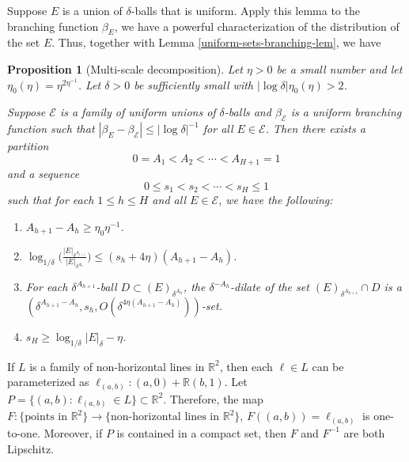 \documentclass{amsart}
\numberwithin{equation}{section}
\newtheorem{proposition}[theorem]{Proposition}
\newcommand{\be}{\beta}
\newcommand{\de}{\delta}
\newcommand{\vp}{\varphi}
\newcommand{\ce}{\mathcal E}
\newcommand{\ZR}{\mathbb{R}}
\begin{document}
Suppose $E$ is a union of $\de$-balls that is uniform.
Apply this lemma to the branching function $\be_E$, we have a powerful characterization of the distribution of the set $E$.
Thus, together with Lemma \ref{uniform-sets-branching-lem}, we have

\begin{proposition}[Multi-scale decomposition]
\label{multiscale-prop}
Let $\eta>0$ be a small number and let $\eta_0(\eta)=\eta^{2\eta^{-1}}$. 
Let $\delta>0$ be sufficiently small with  $|\log \delta| \eta_0(\eta) >2$. 


Suppose $\ce$ is a family of uniform unions of $\de$-balls and $\be_\ce$ is a uniform branching function such that $|\be_{E}-\be_{\ce}|\leq |\log \delta|^{-1}$ for all $E\in \ce$. 
Then there exists a partition
\begin{equation}
    0=A_1<A_2<\cdots<A_{H+1}=1
\end{equation}
and a sequence 
\begin{equation}
    0\leq s_1< s_2<\cdots< s_{H}\leq 1
\end{equation}
such that for each $1\leq h\leq H$ and all $E\in\ce$, we have the following:
\begin{enumerate}
    \item $A_{h+1}-A_h\geq\eta_0\eta^{-1}$.
    \item $\log_{1/\de}\big(\frac{|E|_{\de^{A_{h+1}}}}{|E|_{\de^{A_h}}}\big)\leq (s_h+4\eta)(A_{h+1}-A_h)$.
    \item For each $\de^{A_{h+1}}$-ball $D\subset (E)_{\de^{A_{h}}}$, the $\de^{-A_h}$-dilate of the set $ (E)_{\de^{A_{h+1}}}\cap D$ is a $(\de^{A_{h+1}-A_h}, s_h, O(\de^{4\eta(A_{h+1}-A_h)}))$-set.
    \item $s_H\geq \log_{1/\de}|E|_\de-\eta$.
\end{enumerate}
\end{proposition}

\medskip


If $L$ is a family of non-horizontal lines in $\ZR^2$, then each $\ell\in L$ can be parameterized as $\ell_{(a,b)}:(a,0)+\ZR(b,1)$. Let $P=\{(a,b):\ell_{(a,b)}\in L\}\subset\ZR^2$. Therefore, the map $F:\{\text{points in $\ZR^2$}\}\to\{\text{non-horizontal lines in $\ZR^2$}\}$, $F((a,b))=\ell_{(a,b)}$ is one-to-one. Moreover, if $P$ is contained in a compact set, then $F$ and $F^{-1}$ are both Lipschitz.
\end{document}
